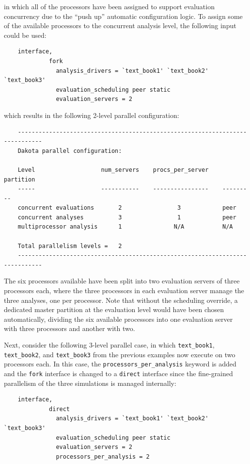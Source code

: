 in which all of the processors have been assigned to support
evaluation concurrency due to the ``push up'' automatic configuration
logic. To assign some of the available processors to the concurrent 
analysis level, the following input could be used:
\begin{small}
\begin{verbatim}
    interface,
             fork
               analysis_drivers = `text_book1' `text_book2' `text_book3'
               evaluation_scheduling peer static
               evaluation_servers = 2
\end{verbatim}
\end{small}

which results in the following 2-level parallel configuration:
\begin{small}
\begin{verbatim}
    -----------------------------------------------------------------------------
    Dakota parallel configuration:

    Level                   num_servers    procs_per_server    partition
    -----                   -----------    ----------------    ---------
    concurrent evaluations       2                3            peer
    concurrent analyses          3                1            peer
    multiprocessor analysis      1               N/A           N/A

    Total parallelism levels =   2
    -----------------------------------------------------------------------------
\end{verbatim}
\end{small}

The six processors available have been split into two evaluation
servers of three processors each, where the three processors in each
evaluation server manage the three analyses, one per processor. Note that
without the scheduling override, a dedicated master partition at the 
evaluation level would have been chosen automatically, dividing
the six available processors into one evaluation server with three 
processors and another with two.

Next, consider the following 3-level parallel case, in which
\texttt{text\_book1}, \texttt{text\_book2}, and \texttt{text\_book3}
from the previous examples now execute on two processors each. In this
case, the \texttt{processors\_per\_analysis} keyword is added and the
\texttt{fork} interface is changed to a \texttt{direct} interface
since the fine-grained parallelism of the three simulations is managed
internally:
\begin{small}
\begin{verbatim}
    interface,
             direct
               analysis_drivers = `text_book1' `text_book2' `text_book3'
               evaluation_scheduling peer static
               evaluation_servers = 2
               processors_per_analysis = 2
\end{verbatim}
\end{small}

